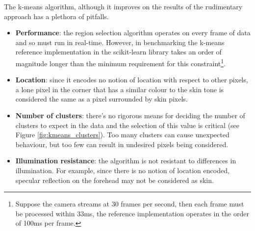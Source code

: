 

The k-means algorithm, although it improves on the results of the rudimentary approach has a plethora of pitfalls.
\begin{itemize}
    \item \textbf{Performance}: the region selection algorithm operates on every frame of data and so must run in real-time. However, in benchmarking the k-means reference implementation in the scikit-learn \cite{sklearn} library takes an order of magnitude longer than the minimum requirement for this constraint\footnote{Suppose the camera streams at 30 frames per second, then each frame must be processed within 33ms, the reference implementation operates in the order of 100ms per frame. }.
    \item \textbf{Location}: since it encodes no notion of location with respect to other pixels, a lone pixel in the corner that has a similar colour to the skin tone is considered the same as a pixel surrounded by skin pixels.
    \item \textbf{Number of clusters}: there's no rigorous means for deciding the number of clusters to expect in the data and the selection of this value is critical (see Figure \ref{fig:kmeans_clusters}). Too many clusters can cause unexpected behaviour, but too few can result in undesired pixels being considered. 
    \item \textbf{Illumination resistance}: the algorithm is not resistant to differences in illumination. For example, since there is no notion of location encoded, specular reflection on the forehead may not be considered as skin.
\end{itemize}

